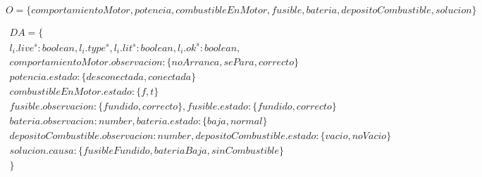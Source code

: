 \documentclass[10pt, a4paper,spanish]{article}
\begin{document}
		\begin{equation*}
			O = \{comportamientoMotor, potencia, combustibleEnMotor, fusible, bateria, depositoCombustible, solucion \}
		\end{equation*}

		\begin{multline*}
			DA = \{ \\
				l_i.live^s:boolean, l_i.type^s, l_i.lit^s:boolean, l_i.ok^s:boolean, \\
				comportamientoMotor.observacion:\{noArranca, sePara, correcto\} \\
				potencia.estado:\{desconectada, conectada\} \\
				combustibleEnMotor.estado:\{f, t\} \\
				fusible.observacion:\{fundido, correcto\}, fusible.estado:\{fundido, correcto\} \\
				bateria.observacion:number, bateria.estado:\{baja, normal\} \\
				depositoCombustible.observacion:number, depositoCombustible.estado:\{vacio, noVacio\} \\
				solucion.causa:\{fusibleFundido, bateriaBaja, sinCombustible\} \\
			\}
		\end{multline*}
\end{document}
